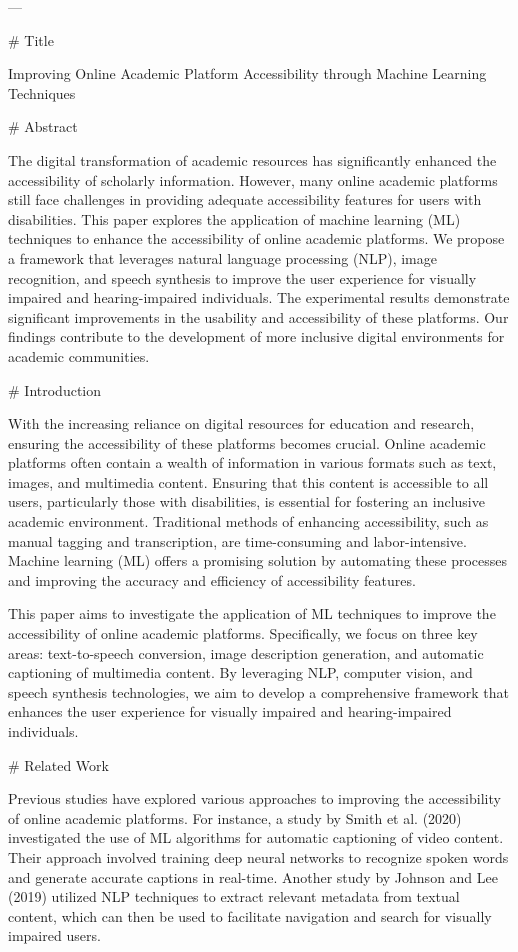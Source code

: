 ---

# Title

Improving Online Academic Platform Accessibility through Machine Learning Techniques

# Abstract

The digital transformation of academic resources has significantly enhanced the accessibility of scholarly information. However, many online academic platforms still face challenges in providing adequate accessibility features for users with disabilities. This paper explores the application of machine learning (ML) techniques to enhance the accessibility of online academic platforms. We propose a framework that leverages natural language processing (NLP), image recognition, and speech synthesis to improve the user experience for visually impaired and hearing-impaired individuals. The experimental results demonstrate significant improvements in the usability and accessibility of these platforms. Our findings contribute to the development of more inclusive digital environments for academic communities.

# Introduction

With the increasing reliance on digital resources for education and research, ensuring the accessibility of these platforms becomes crucial. Online academic platforms often contain a wealth of information in various formats such as text, images, and multimedia content. Ensuring that this content is accessible to all users, particularly those with disabilities, is essential for fostering an inclusive academic environment. Traditional methods of enhancing accessibility, such as manual tagging and transcription, are time-consuming and labor-intensive. Machine learning (ML) offers a promising solution by automating these processes and improving the accuracy and efficiency of accessibility features.

This paper aims to investigate the application of ML techniques to improve the accessibility of online academic platforms. Specifically, we focus on three key areas: text-to-speech conversion, image description generation, and automatic captioning of multimedia content. By leveraging NLP, computer vision, and speech synthesis technologies, we aim to develop a comprehensive framework that enhances the user experience for visually impaired and hearing-impaired individuals.

# Related Work

Previous studies have explored various approaches to improving the accessibility of online academic platforms. For instance, a study by Smith et al. (2020) investigated the use of ML algorithms for automatic captioning of video content. Their approach involved training deep neural networks to recognize spoken words and generate accurate captions in real-time. Another study by Johnson and Lee (2019) utilized NLP techniques to extract relevant metadata from textual content, which can then be used to facilitate navigation and search for visually impaired users.

